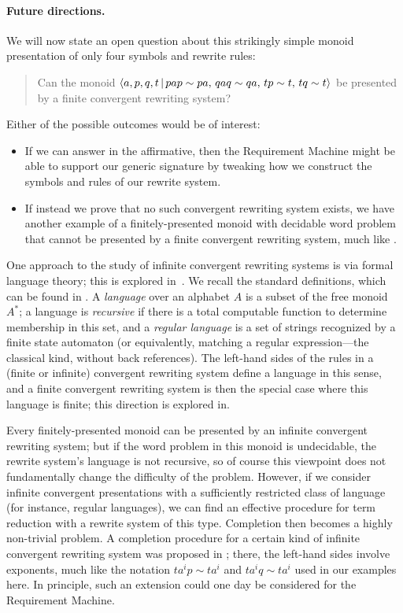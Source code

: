 \documentclass[../generics]{subfiles}
\begin{document}
\begin{example}
\paragraph{Future directions.} We will now state an open question about this strikingly simple monoid presentation of only four symbols and rewrite rules:
\begin{quote}
Can the monoid $\langle a,p,q,t\,|\,pap\sim pa,\, qaq\sim qa,\, tp\sim t,\, tq\sim t\rangle$ be presented by a finite convergent rewriting system?
\end{quote}
Either of the possible outcomes would be of interest:
\begin{itemize}
\item If we can answer in the affirmative, then the Requirement Machine might be able to support our generic signature by tweaking how we construct the symbols and rules of our rewrite system.
\item If instead we prove that no such convergent rewriting system exists, we have another example of a finitely-presented monoid with decidable word problem that cannot be presented by a finite convergent rewriting system, much like .
\end{itemize}

One approach to the study of infinite convergent rewriting systems is via formal language theory; this is explored in~\cite{OTTO1998621}. We recall the standard definitions, which can be found in \cite{formalmans1}. A \emph{language} over an alphabet $A$ is a subset of the free monoid $A^*$; a language is \emph{recursive} if there is a total computable function to determine membership in this set, and a \emph{regular language} is a set of strings recognized by a finite state automaton (or equivalently, matching a regular expression---the classical kind, without back references). The left-hand sides of the rules in a (finite or infinite) convergent rewriting system define a language in this sense, and a finite convergent rewriting system is then the special case where this language is finite; this direction is explored in.

Every finitely-presented monoid can be presented by an infinite convergent rewriting system; but if the word problem in this monoid is undecidable, the rewrite system's language is not recursive, so of course this viewpoint does not fundamentally change the difficulty of the problem. However, if we consider infinite convergent presentations with a sufficiently restricted class of language (for instance, regular languages), we can find an effective procedure for term reduction with a rewrite system of this type. Completion then becomes a highly non-trivial problem. A completion procedure for a certain kind of infinite convergent rewriting system was proposed in \cite{NEEDHAM1996195}; there, the left-hand sides involve exponents, much like the notation $ta^ip\sim ta^i$ and $ta^iq\sim ta^i$ used in our examples here. In principle, such an extension could one day be considered for the Requirement Machine.
\end{example}
\end{document}
